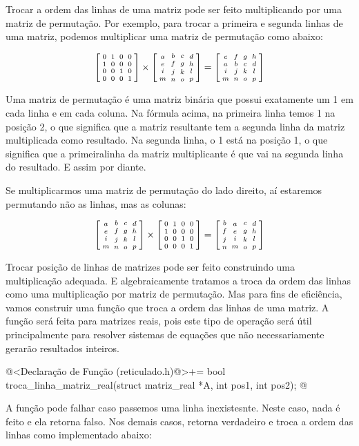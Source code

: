 Trocar a ordem das linhas de uma matriz pode ser feito multiplicando
por uma matriz de permutação. Por exemplo, para trocar a primeira e
segunda linhas de uma matriz, podemos multiplicar uma matriz de
permutação como abaixo:

$$
\left[{{0\atop 1}\atop{0\atop 0}}
{{1\atop 0}\atop{0\atop 0}}
{{0\atop 0}\atop{1\atop 0}}
{{0\atop 0}\atop{0\atop 1}}
\right]\times
\left[{{a\atop e}\atop{i\atop m}}
{{b\atop f}\atop{j\atop n}}
{{c\atop g}\atop{k\atop o}}
{{d\atop h}\atop{l\atop p}}
\right]=
\left[{{e\atop a}\atop{i\atop m}}
{{f\atop b}\atop{j\atop n}}
{{g\atop c}\atop{k\atop o}}
{{h\atop d}\atop{l\atop p}}
\right]
$$

Uma matriz de permutação é uma matriz binária que possui exatamente um
1 em cada linha e em cada coluna. Na fórmula acima, na primeira linha
temos 1 na posição 2, o que significa que a matriz resultante tem a
segunda linha da matriz multiplicada como resultado. Na segunda linha,
o 1 está na posição 1, o que significa que a primeiralinha da matriz
multiplicante é que vai na segunda linha do resultado. E assim por
diante.

Se multiplicarmos uma matriz de permutação do lado direito, aí
estaremos permutando não as linhas, mas as colunas:

$$
\left[{{a\atop e}\atop{i\atop m}}
{{b\atop f}\atop{j\atop n}}
{{c\atop g}\atop{k\atop o}}
{{d\atop h}\atop{l\atop p}}
\right]\times
\left[{{0\atop 1}\atop{0\atop 0}}
{{1\atop 0}\atop{0\atop 0}}
{{0\atop 0}\atop{1\atop 0}}
{{0\atop 0}\atop{0\atop 1}}
\right]=
\left[{{b\atop f}\atop{j\atop n}}
{{a\atop e}\atop{i\atop m}}
{{c\atop g}\atop{k\atop o}}
{{d\atop h}\atop{l\atop p}}
\right]
$$

Trocar posição de linhas de matrizes pode ser feito construindo uma
multiplicação adequada. E algebraicamente tratamos a troca da ordem
das linhas como uma multiplicação por matriz de permutação. Mas para
fins de eficiência, vamos construir uma função que troca a ordem das
linhas de uma matriz. A função será feita para matrizes reais, pois
este tipo de operação será útil principalmente para resolver sistemas
de equações que não necessariamente gerarão resultados inteiros.

\iniciocodigo
@<Declaração de Função (reticulado.h)@>+=
bool troca_linha_matriz_real(struct matriz_real *A, int pos1, int pos2);
@
\fimcodigo

A função pode falhar caso passemos uma linha inexistesnte. Neste caso,
nada é feito e ela retorna falso. Nos demais casos, retorna verdadeiro
e troca a ordem das linhas como implementado abaixo:


